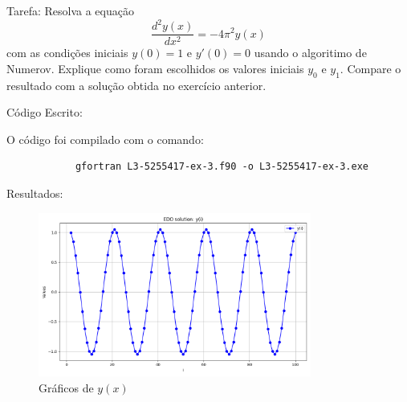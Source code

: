 \documentclass[12pt, a4paper]{article} %
\begin{document}
        Tarefa: Resolva a equa\c{c}\~ao
        \begin{equation*}
            \frac{d^{2}y(x)}{dx^{2}} = -4\pi^{2}y(x)
        \end{equation*}
        com as condi\c{c}\~oes iniciais $y(0) = 1$ e $y'(0) = 0$ usando o algoritimo de Numerov. Explique como foram escolhidos os valores iniciais $y_{0}$ e $y_{1}$. Compare o resultado com a solu\c{c}\~ao obtida no exerc\'icio anterior.

        C\'odigo Escrito:
        

        O c\'odigo foi compilado com o comando:
        \begin{verbatim}
            gfortran L3-5255417-ex-3.f90 -o L3-5255417-ex-3.exe
        \end{verbatim}

        Resultados:
        \begin{figure}[H]
            \centering
            \includegraphics[width=0.8\textwidth]{../images/results-ex-3.png}
            \caption{Gr\'aficos de $y(x)$}
        \end{figure}

        
\end{document}
